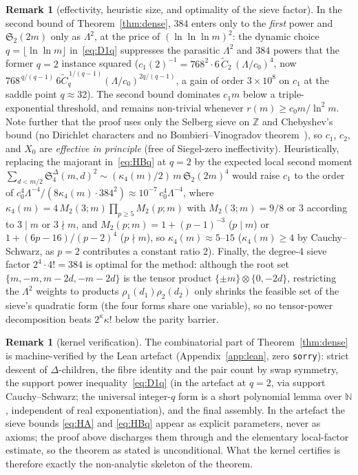 \documentclass[11pt]{article}
\theoremstyle{plain}
\theoremstyle{definition}
\newtheorem{remark}[theorem]{Remark}
\newcommand{\rch}{r}
\begin{document}
\begin{remark}[effectivity, heuristic size, and optimality of the sieve factor]
\label{rem:densesize}
In the second bound of Theorem~\ref{thm:dense}, $384$ enters only
to the \emph{first} power and $\mathfrak{S}_2(2m)$ only as
$\Lambda^{2}$, at the price of $(\ln\ln\ln m)^{2}$: the dynamic
choice $q = \lfloor \ln\ln m \rfloor$ in~\eqref{eq:D1q} suppresses
the parasitic $\Lambda^{2}$ and $384$ powers that the former
$q = 2$ instance squared ($c_1(2)^{-1} =
768^{2}\cdot 6\,\widetilde C_2\,(\Lambda/c_0)^{4}$, now
$768^{\,q/(q-1)}\,6\widetilde C_q^{\,1/(q-1)}
(\Lambda/c_0)^{2q/(q-1)}$, a gain of order $3\times 10^{8}$ on
$c_1$ at the saddle point $q \approx 32$). The second bound
dominates $c_1 m$ below a triple-exponential threshold, and remains
non-trivial whenever $\rch(m) \ge c_0 m/\ln^{2} m$. Note further
that the proof uses only the Selberg sieve on $\mathbb{Z}$ and
Chebyshev's bound (no Dirichlet characters and no
Bombieri--Vinogradov theorem~\cite{bombieri,vinogradovA}), so $c_1$,
$c_2$, and $X_0$ are \emph{effective in principle} (free of
Siegel-zero ineffectivity). Heuristically, replacing the majorant
in~\eqref{eq:HBq} at $q = 2$ by the expected local second moment
$\sum_{d<m/2} \mathfrak{S}_4^{\Delta}(m,d)^{2} \sim
(\kappa_4(m)/2)\, m\,\mathfrak{S}_2(2m)^{4}$ would raise $c_1$ to
the order of $c_0^{4}\Lambda^{-4}/(8\kappa_4(m)\cdot 384^{2}) \approx
10^{-7}\, c_0^{4}\Lambda^{-4}$, where
$\kappa_4(m) = 4\, M_2(3;m) \prod_{p \ge 5} M_2(p;m)$ with
$M_2(3;m) = 9/8$ or $3$ according to $3 \mid m$ or $3 \nmid m$, and
$M_2(p;m) = 1 + (p-1)^{-3}$ ($p \mid m$) or
$1 + (6p-16)/(p-2)^{4}$ ($p \nmid m$), so $\kappa_4(m) \approx
5$--$15$ ($\kappa_4(m) \ge 4$ by Cauchy--Schwarz, as $p=2$
contributes a constant ratio $2$). Finally, the degree-$4$ sieve
factor $2^{4} \cdot 4! = 384$ is optimal for the method: although
the root set $\{m,-m,m-2d,-m-2d\}$ is the tensor product
$\{\pm m\}\otimes\{0,-2d\}$, restricting the $\Lambda^{2}$ weights
to products $\rho_1(d_1)\rho_2(d_2)$ only shrinks the feasible set
of the sieve's quadratic form (the four forms share one variable),
so no tensor-power decomposition beats $2^\kappa \kappa!$ below the
parity barrier.
\end{remark}

\begin{remark}[kernel verification]\label{rem:leandense}
The combinatorial part of Theorem~\ref{thm:dense} is
machine-verified by the Lean artefact (Appendix~\ref{app:lean},
zero \texttt{sorry}): strict descent of $\Delta$-children, the
fibre identity and the pair count by swap symmetry, the support
power inequality~\eqref{eq:D1q} (in the artefact at $q = 2$, via
support Cauchy--Schwarz; the universal integer-$q$ form is a short
polynomial lemma over $\mathbb{N}$, independent of real
exponentiation), and the final assembly. In the artefact the sieve
bounds \eqref{eq:HA} and \eqref{eq:HBq} appear as explicit
parameters, never as axioms; the proof above discharges them
through \cite[Theorem~5.7]{hr} and the elementary local-factor
estimate, so the theorem as stated is unconditional. What the
kernel certifies is therefore exactly the non-analytic skeleton of
the theorem.
\end{remark}
\end{document}

